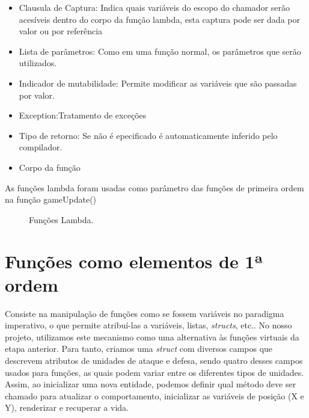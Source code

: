 \documentclass[rel_mlp]{iiufrgs}
\newcommand{\fonte}[1]{\\Fonte: {#1}}
\begin{document}
 \begin{itemize}
	\item{Clausula de Captura: 
		Indica quais variáveis do escopo do chamador serão acesíveis dentro do corpo da função lambda, esta captura pode ser dada por valor ou por referência}
	\item{Lista de parâmetros: Como em uma função normal, os parâmetros que serão utilizados.}
	\item{Indicador de mutabilidade: Permite modificar as variáveis que são passadas por valor. }
	\item{Exception:Tratamento de exceções}
	\item{ Tipo de retorno:	Se não é epecificado é automaticamente inferido pelo compilador.}
	\item{Corpo da função}
 \end{itemize}
As funções lambda foram usadas como parâmetro das funções de primeira ordem na função gameUpdate()
\begin{figure}[htb]
    \centering
    \label{fig:figura1}
    \caption{Funções Lambda.}
\end{figure}
 \section{Funções como elementos de 1ª ordem}

	Consiste na manipulação de funções como se fossem variáveis no paradigma imperativo, o que permite atribuí-las a variáveis, listas, \textit{structs}, etc.. No nosso projeto, utilizamos este mecanismo como uma alternativa às funções virtuais da etapa anterior. Para tanto, criamos uma \textit{struct} com diversos campos que descrevem atributos de unidades de ataque e defesa, sendo quatro desses campos usados para funções, as quais podem variar entre os diferentes tipos de unidades. Assim, ao inicializar uma nova entidade, podemos definir qual método deve ser chamado para atualizar o comportamento, inicializar as variáveis de posição (X e Y), renderizar e recuperar a vida.
\end{document}
